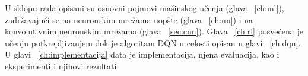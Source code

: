\par 
U sklopu rada opisani su osnovni pojmovi mašinskog učenja (glava ~\ref{ch:ml}), zadržavajući se na neuronskim mrežama uopšte (glava ~\ref{ch:nn}) i na konvolutivnim neuronskim mrežama (glava ~\ref{sec:cnn}). Glava ~\ref{ch:rl} posvećena je učenju potkrepljivanjem dok je algoritam DQN u celosti opisan u glavi ~\ref{ch:dqn}. U glavi ~\ref{ch:implementacija} data je implementacija, njena evaluacija, kao i eksperimenti i njihovi rezultati.